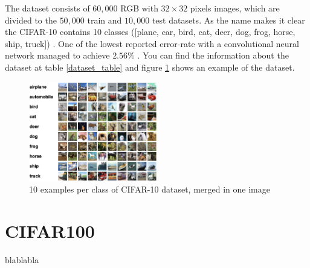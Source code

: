 The dataset consists of $60,000$  RGB with $32 \times 32$ pixels images, which are divided to the $50,000$ train and $10,000$ test datasets. As the name makes it clear the CIFAR-10 contains 10 classes ([plane, car, bird, cat, deer, dog, frog, horse, ship, truck]) \cite{CIFAR-10_dataset_reference}. 
One of the lowest reported error-rate with a convolutional neural network managed to achieve $2.56\%$ \cite{CIFAR-10_best_result_reference}.  You can
find the information about the dataset at table
\ref{dataset_table} and figure \ref{fig:cifar-10_dataset_example} shows an example of the dataset. 

\begin{figure}
  \centering
  \label{fig:cifar-10_dataset_example}
  \includegraphics[width=0.5\textwidth]{fig/cifar-10}
  \caption{10 examples per class of CIFAR-10 dataset, merged in one image \cite{CIFAR-10_dataset_reference}}
\end{figure}


\section{CIFAR100}
blablabla


